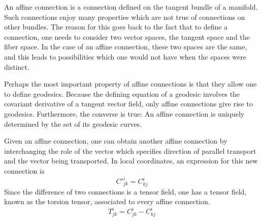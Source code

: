 \documentclass[12pt]{article}
\begin{document}
An affine connection is a connection defined on the tangent bundle of a manifold.  Such connections enjoy many properties which are not true of connections on other bundles.  The reason for this goes back to the fact that to define a connection, one needs to consider two vector spaces, the tangent space and the fiber space.  In the case of an affine connection, these two spaces are the same, and this leads to possibilities which one would not have when the spaces were distinct.

Perhaps the most important property of affine connections is that they allow one to define geodesics.  Because the defining equation of a geodesic involves the covariant derivative of a tangent vector field, only affine connections give rise to geodesics.  Furthermore, the converse is true:  An affine connection is uniquely determined by the set of its geodesic curves.

Given an affine connection, one can obtain another affine connection by interchanging the role of the vector which specifies direction of parallel transport and the vector being transported.  In local coordinates, an expression for this new connection is
 $${C'}^i_{jk} = C^i_{kj}$$
Since the difference of two connections is a tensor field, one has a tensor field, known as the torsion tensor, associated to every affine connection. 
 $$T^i_{jk} = C^i_{jk} - C^i_{kj}$$
\end{document}
